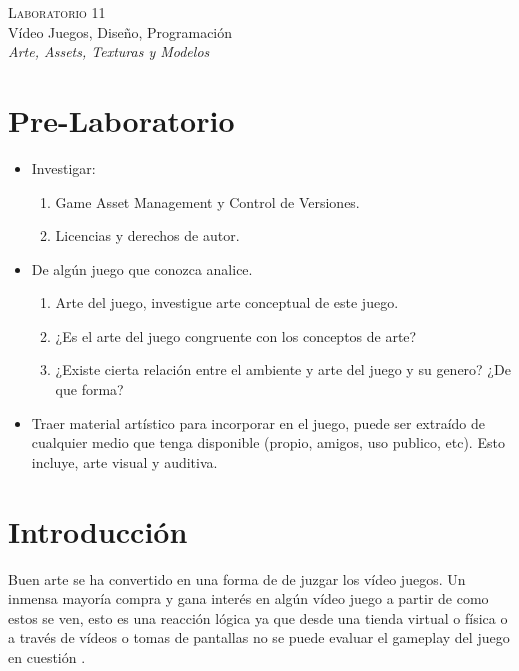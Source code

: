 \begin{center}
\textsc{\Large Laboratorio 11}~\\
{\large Vídeo Juegos, Diseño, Programación}~\\
\emph{Arte, Assets, Texturas y Modelos}
\end{center}

\section{Pre-Laboratorio}
\begin{itemize}
\item Investigar:
\begin{enumerate}
  \item Game Asset Management y Control de Versiones.
  \item Licencias y derechos de autor.
\end{enumerate}
\item De algún juego que conozca analice.
\begin{enumerate}
  \item Arte del juego, investigue arte conceptual de este juego.
  \item ¿Es el arte del juego congruente con los conceptos de arte?
  \item ¿Existe cierta relación entre el ambiente y arte del juego y su genero? ¿De que forma?
\end{enumerate}
\item Traer material artístico para incorporar en el juego, puede ser extraído de cualquier medio que tenga disponible (propio, amigos, uso publico, etc). Esto incluye, arte visual y auditiva.
\end{itemize}

\setlength\intextsep{0pt}
\section{Introducción}
Buen arte se ha convertido en una forma de de juzgar los vídeo juegos. Un inmensa mayoría compra y gana interés en algún vídeo juego a partir de como estos se ven, esto es una reacción lógica ya que desde una tienda virtual o física o a través de vídeos o tomas de pantallas no se puede evaluar el gameplay del juego en cuestión \cite[p.~171]{bobbatesgamedesign}.

